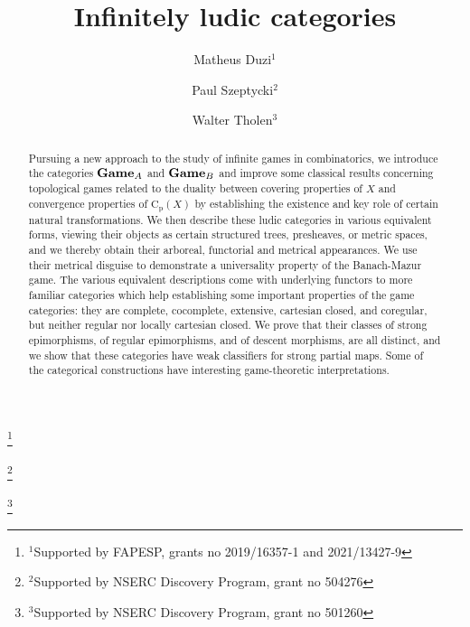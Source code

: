 \documentclass[12pt]{amsart}
\theoremstyle{definition}
\newcommand{\Cp}{\mathrm{C}_{\mathrm {p}}}
\begin{document}
	\title{Infinitely ludic categories}
	\author[M. Duzi]{Matheus Duzi$^1$}
	\address{Instituto de Ci\^encias Matem\'aticas e de Computa\c c\~ao, Universidade de S\~ao Paulo\\
		Avenida Trabalhador s\~ao-carlense, 400,  S\~ao Carlos, SP, 13566-590, Brazil}
	\thanks{$^1$Supported by FAPESP, grants no 2019/16357-1 and 2021/13427-9}
	\author[P. Szeptycki]{Paul Szeptycki$^2$}
	\address{Department of Mathematics and Statistics, York University\\
		Toronto, Ontario, Canada M3J 1P3}
	\thanks{$^2$Supported by NSERC Discovery Program, grant no 504276}
	\author[W. Tholen]{Walter Tholen$^3$}
	\address{Department of Mathematics and Statistics, York University\\
		Toronto, Ontario, Canada M3J 1P3}
	\thanks{$^3$Supported by NSERC Discovery Program, grant no 501260}
	
	\begin{abstract}
		Pursuing a new approach to the study of infinite games in combinatorics, we introduce the categories $\mathbf{Game}_{\textsc{A}}$ and $\mathbf{Game}_{\textsc{B}}$ and improve some classical results concerning topological games related to the duality between covering properties of $X$ and convergence properties of $\Cp(X)$ by establishing the existence and key role of certain natural transformations. We then describe these ludic categories in various equivalent forms, viewing their objects as certain structured trees, presheaves, or metric spaces, and we thereby obtain their arboreal, functorial and metrical appearances. We use their metrical disguise to demonstrate a universality property of the Banach-Mazur game. The various equivalent descriptions come with underlying functors to more familiar categories which help establishing some important properties of the game categories: they are complete, cocomplete, extensive, cartesian closed, and coregular, but neither regular nor locally cartesian closed. We prove that their classes of strong epimorphisms, of regular epimorphisms, and of descent morphisms, are all distinct, and we show that these categories have weak classifiers for strong partial maps. Some of the categorical constructions have interesting game-theoretic interpretations.
	\end{abstract}
	\maketitle		
	
\end{document}
